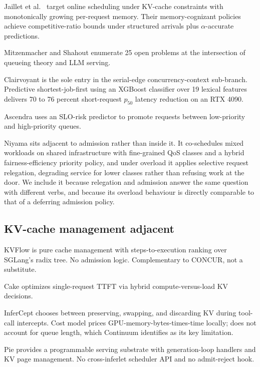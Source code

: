 \documentclass[10pt]{article} %
\theoremstyle{definition}
\begin{document}
Jaillet et al.\ \citep{jaillet2026online} target online scheduling
under KV-cache constraints with monotonically growing per-request
memory. Their memory-cognizant policies achieve competitive-ratio
bounds under structured arrivals plus $\alpha$-accurate predictions.

Mitzenmacher and Shahout \citep{mitzenmacher2025queueing} enumerate 25
open problems at the intersection of queueing theory and LLM serving.

Clairvoyant \citep{sundaresan2026clairvoyant} is the sole entry in the
serial-edge concurrency-context sub-branch. Predictive
shortest-job-first using an XGBoost classifier over 19 lexical
features delivers 70 to 76 percent short-request $p_{50}$ latency
reduction on an RTX 4090.

Ascendra \citep{elnikety2025ascendra} uses an SLO-risk predictor to
promote requests between low-priority and high-priority queues.

Niyama \citep{goel2025niyama} sits adjacent to admission rather than
inside it. It co-schedules mixed workloads on shared infrastructure with
fine-grained QoS classes and a hybrid fairness-efficiency priority
policy, and under overload it applies selective request relegation,
degrading service for lower classes rather than refusing work at the
door. We include it because relegation and admission answer the same
question with different verbs, and because its overload behaviour is
directly comparable to that of a deferring admission policy.

\subsection{KV-cache management adjacent}

KVFlow \citep{pan2025kvflow} is pure cache management with
steps-to-execution ranking over SGLang's radix tree. No admission
logic. Complementary to CONCUR, not a substitute.

Cake \citep{jin2025cake} optimizes single-request TTFT via hybrid
compute-versus-load KV decisions.

InferCept \citep{abhyankar2024infercept} chooses between preserving,
swapping, and discarding KV during tool-call intercepts. Cost model
prices GPU-memory-bytes-times-time locally; does not account for
queue length, which Continuum identifies as its key limitation.

Pie \citep{gim2025pie} provides a programmable serving substrate with
generation-loop handlers and KV page management. No cross-inferlet
scheduler API and no admit-reject hook.
\end{document}
